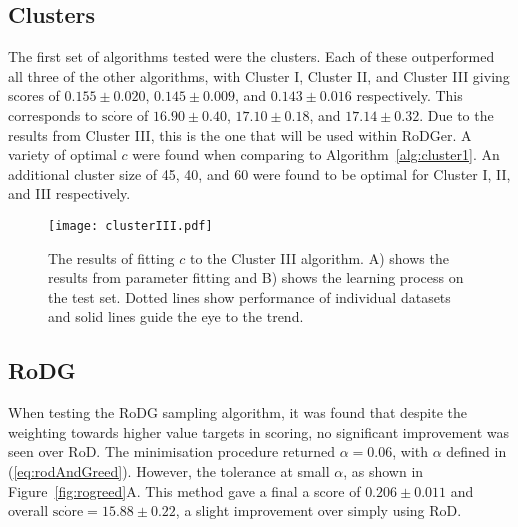 \subsection{Clusters}
The first set of algorithms tested were the clusters. Each of these outperformed all three of the other algorithms, with Cluster I, Cluster II, and Cluster III giving scores of ${0.155\pm{}0.020}$, ${0.145\pm{}0.009}$, and ${0.143\pm{}0.016}$ respectively. This corresponds to $\dot{\mathrm{score}}$ of ${16.90\pm{}0.40}$, ${17.10\pm{}0.18}$, and ${17.14\pm{}0.32}$. Due to the results from Cluster III, this is the one that will be used within RoDGer. A variety of optimal ${c}$ were found when comparing to Algorithm~\ref{alg:cluster1}. An additional cluster size of 45, 40, and 60 were found to be optimal for Cluster I, II, and III respectively.

\begin{figure}[H]
    \begin{center}
        \texttt{[image: clusterIII.pdf]}
        \caption[Cluster III]{The results of fitting $c$ to the Cluster III algorithm. A) shows the results from parameter fitting and B) shows the learning process on the test set. Dotted lines show performance of individual datasets and solid lines guide the eye to the trend.}
        \label{fig:clusterTest}
    \end{center}
\end{figure}

\subsection[Region of Disagreement with Greed]{RoDG}
When testing the RoDG sampling algorithm, it was found that despite the weighting towards higher value targets in scoring, no significant improvement was seen over RoD. The minimisation procedure returned ${\alpha{}=0.06}$, with $\alpha$ defined in (\ref{eq:rodAndGreed}). However, the tolerance at small $\alpha$, as shown in Figure~\ref{fig:rogreed}A. This method gave a final a score of ${0.206\pm{}0.011}$ and overall $\dot{\mathrm{score}}=15.88\pm{}0.22$, a slight improvement over simply using RoD.

